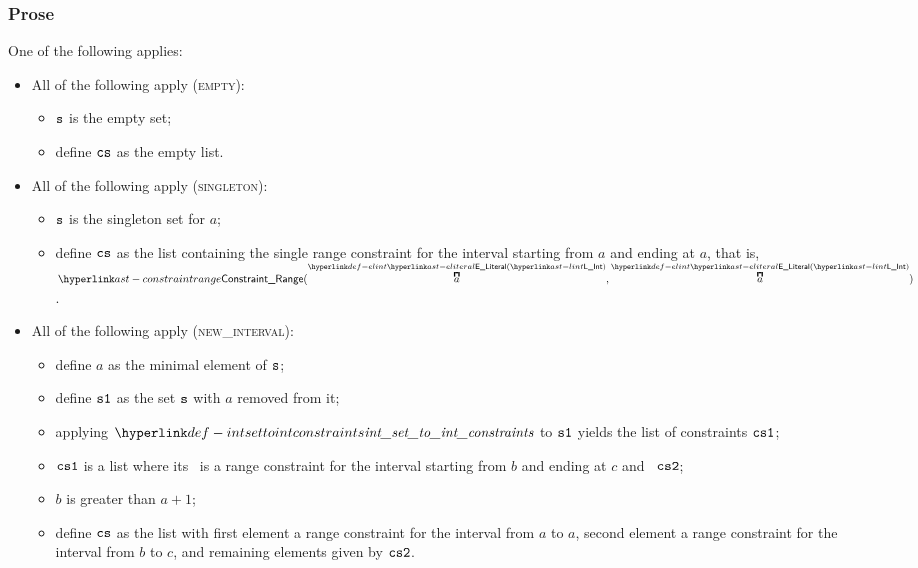 \subsubsection{Prose}
One of the following applies:
\begin{itemize}
  \item All of the following apply (\textsc{empty}):
  \begin{itemize}
    \item $\texttt{s}$ is the empty set;
    \item define $\texttt{cs}$ as the empty list.
  \end{itemize}

  \item All of the following apply (\textsc{singleton}):
  \begin{itemize}
    \item $\texttt{s}$ is the singleton set for $a$;
    \item define $\texttt{cs}$ as the list containing the single range constraint for the interval starting from $a$
          and ending at $a$, that is, $\ConstraintRange(\ELInt{a}, \ELInt{a})$.
  \end{itemize}

  \item All of the following apply (\textsc{new\_interval}):
  \begin{itemize}
    \item define $a$ as the minimal element of $\texttt{s}$;
    \item define $\texttt{s1}$ as the set $\texttt{s}$ with $a$ removed from it;
    \item applying $\intsettointconstraints$ to $\texttt{s1}$ yields the list of constraints $\texttt{cs1}$;
    \item $\texttt{cs1}$ is a list where its \head\ is a range constraint for the interval starting from $b$ and ending at $c$
          and \tail\ $\texttt{cs2}$;
    \item $b$ is greater than $a+1$;
    \item define $\texttt{cs}$ as the list with first element a range constraint for the interval from $a$ to $a$,
          second element a range constraint for the interval from $b$ to $c$, and remaining elements given by $\texttt{cs2}$.
  \end{itemize}


\end{itemize}
